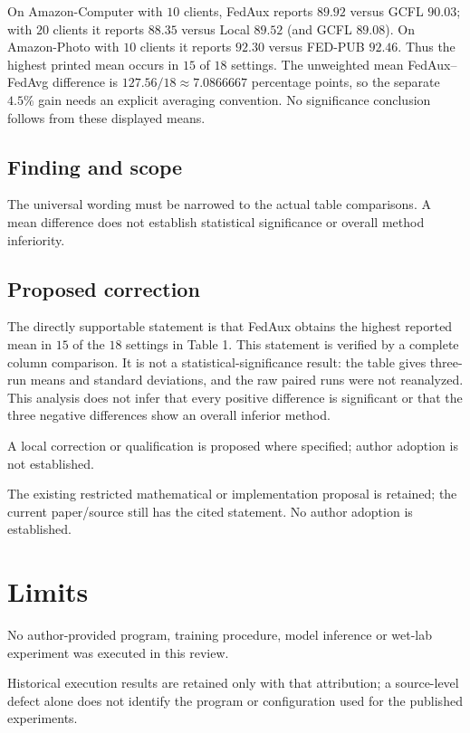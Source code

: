 \documentclass[11pt]{article}
\begin{document}
On Amazon-Computer with \(10\) clients, FedAux reports \(89.92\) versus GCFL \(90.03\); with \(20\) clients it reports \(88.35\) versus Local \(89.52\) (and GCFL \(89.08\)). On Amazon-Photo with \(10\) clients it reports \(92.30\) versus FED-PUB \(92.46\). Thus the highest printed mean occurs in \(15\) of \(18\) settings. The unweighted mean FedAux–FedAvg difference is \(127.56/18\approx7.0866667\) percentage points, so the separate \(4.5\%\) gain needs an explicit averaging convention. No significance conclusion follows from these displayed means.

\subsection*{Finding and scope}

The universal wording must be narrowed to the actual table comparisons. A mean difference does not establish statistical significance or overall method inferiority.

\subsection*{Proposed correction}

The directly supportable statement is that FedAux obtains the highest reported mean in \(15\) of the \(18\) settings in Table 1. This statement is verified by a complete column comparison. It is not a statistical-significance result: the table gives three-run means and standard deviations, and the raw paired runs were not reanalyzed. This analysis does not infer that every positive difference is significant or that the three negative differences show an overall inferior method.

A local correction or qualification is proposed where specified; author adoption is not established.

The existing restricted mathematical or implementation proposal is retained; the current paper/source still has the cited statement. No author adoption is established.

\section*{Limits}

No author-provided program, training procedure, model inference or wet-lab experiment was executed in this review.\par

Historical execution results are retained only with that attribution; a source-level defect alone does not identify the program or configuration used for the published experiments.\par
\end{document}
